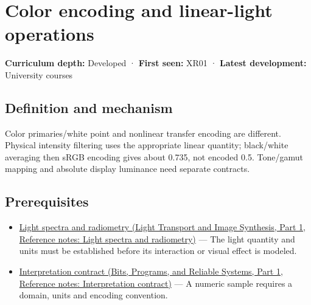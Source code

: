 \hypertarget{appendix-a9f83ad40792}{}\label{referencestart:appendix-a9f83ad40792}
\section{Color encoding and linear-light operations}\label{appendix-a9f83ad40792-color-encoding-and-linear-light-operations}

\hypertarget{appendix-a9f83ad40792-color-encoding-and-linear-light-operations}{}

\textbf{Curriculum depth:} Developed · \textbf{First seen:} XR01 · \textbf{Latest development:} University courses

\begin{allmightroledefinition}

\subsection{Definition and mechanism}\label{appendix-a9f83ad40792-definition-and-mechanism}

\hypertarget{appendix-a9f83ad40792-definition-and-mechanism}{}

Color primaries/white point and nonlinear transfer encoding are different. Physical intensity filtering uses the appropriate linear quantity; black/white averaging then sRGB encoding gives about 0.735, not encoded 0.5. Tone/gamut mapping and absolute display luminance need separate contracts.

\end{allmightroledefinition}

\subsection{Prerequisites}\label{appendix-a9f83ad40792-prerequisites}

\hypertarget{appendix-a9f83ad40792-prerequisites}{}

\begin{itemize}
\tightlist
\item
  \href{../04-Light-Transport-and-Image-Synthesis-P01/main.pdf\#appendix-215c2570199b}{Light spectra and radiometry (Light Transport and Image Synthesis, Part 1, Reference notes: Light spectra and radiometry)} --- The light quantity and units must be established before its interaction or visual effect is modeled.
\item
  \href{../01-Bits-Programs-and-Reliable-Systems-P01/main.pdf\#appendix-f414bd4ed05c}{Interpretation contract (Bits, Programs, and Reliable Systems, Part 1, Reference notes: Interpretation contract)} --- A numeric sample requires a domain, units and encoding convention.
\end{itemize}

